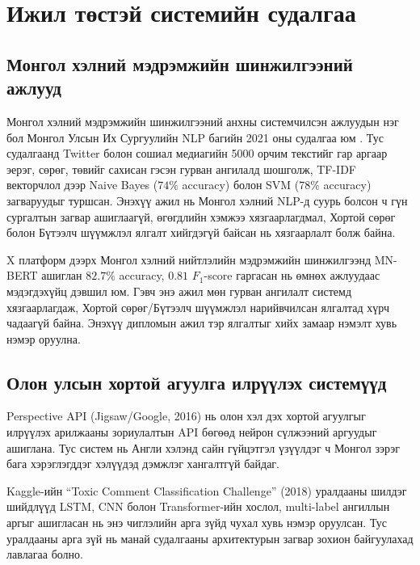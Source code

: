 
\section{Ижил төстэй системийн судалгаа}

\subsection{Монгол хэлний мэдрэмжийн шинжилгээний ажлууд}

Монгол хэлний мэдрэмжийн шинжилгээний анхны системчилсэн ажлуудын нэг бол
Монгол Улсын Их Сургуулийн NLP багийн 2021 оны судалгаа юм \cite{mnunlp2021}.
Тус судалгаанд Twitter болон сошиал медиагийн 5000 орчим текстийг гар аргаар
эерэг, сөрөг, төвийг сахисан гэсэн гурван ангилалд шошголж, TF-IDF векторчлол
дээр Naive Bayes ($74\%$ accuracy) болон SVM ($78\%$ accuracy) загваруудыг
туршсан. Энэхүү ажил нь Монгол хэлний NLP-д суурь болсон ч гүн сургалтын
загвар ашиглаагүй, өгөгдлийн хэмжээ хязгаарлагдмал, Хортой сөрөг болон Бүтээлч шүүмжлэл
ялгалт хийгдэгүй байсан нь хязгаарлалт болж байна.

\cite{jargalmaa2025} X платформ дээрх Монгол хэлний нийтлэлийн мэдрэмжийн
шинжилгээнд MN-BERT ашиглан $82.7\%$ accuracy, $0.81$ $F_1$-score гаргасан нь
өмнөх ажлуудаас мэдэгдэхүйц дэвшил юм. Гэвч энэ ажил мөн гурван ангилалт
системд хязгаарлагдаж, Хортой сөрөг/Бүтээлч шүүмжлэл нарийвчилсан ялгалтад хүрч чадаагүй
байна. Энэхүү дипломын ажил тэр ялгалтыг хийх замаар нэмэлт хувь нэмэр оруулна.

\subsection{Олон улсын хортой агуулга илрүүлэх системүүд}

Perspective API (Jigsaw/Google, 2016) нь олон хэл дэх хортой агуулгыг илрүүлэх
арилжааны зориулалтын API бөгөөд нейрон сүлжээний аргуудыг ашиглана. Тус систем
нь Англи хэлэнд сайн гүйцэтгэл үзүүлдэг ч Монгол зэрэг бага хэрэглэгддэг
хэлүүдэд дэмжлэг хангалтгүй байдаг.

Kaggle-ийн ``Toxic Comment Classification Challenge'' (2018) уралдааны шилдэг
шийдлүүд LSTM, CNN болон Transformer-ийн хослол, multi-label ангиллын аргыг
ашигласан нь энэ чиглэлийн арга зүйд чухал хувь нэмэр оруулсан. Тус уралдааны
арга зүй нь манай судалгааны архитектурын загвар зохион байгуулахад лавлагаа
болно.

